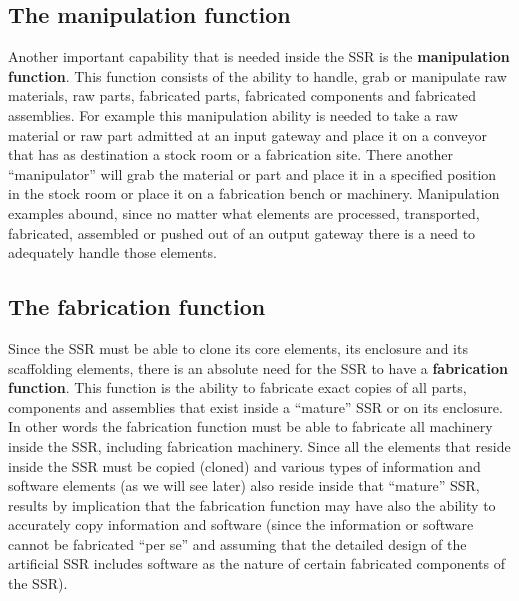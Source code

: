 \bigskip

\subsection[The manipulation function]{The manipulation function}
\hypertarget{RefHeading3072306210128}{}Another important capability that
is needed inside the SSR is the \textbf{manipulation function}. This
function consists of the ability to handle, grab or manipulate raw
materials, raw parts, fabricated parts, fabricated components and
fabricated assemblies. For example this manipulation ability is needed
to take a raw material or raw part admitted at an input gateway and
place it on a conveyor that has as destination a stock room or a
fabrication site. There another “manipulator” will grab the material or
part and place it in a specified position in the stock room or place it
on a fabrication bench or machinery. Manipulation examples abound,
since no matter what elements are processed, transported, fabricated,
assembled or pushed out of an output gateway there is a need to
adequately handle those elements.


\bigskip

\subsection[The fabrication function]{The fabrication function}
\hypertarget{RefHeading3074306210128}{}Since the SSR must be able to
clone its core elements, its enclosure and its scaffolding elements,
there is an absolute need for the SSR to have a \textbf{fabrication
function}. This function is the ability to fabricate exact copies of
all parts, components and assemblies that exist inside a “mature” SSR
or on its enclosure. In other words the fabrication function must be
able to fabricate all machinery inside the SSR, including fabrication
machinery. Since all the elements that reside inside the SSR must be
copied (cloned) and various types of information and software elements
(as we will see later) also reside inside that “mature” SSR, results by
implication that the fabrication function may have also the ability to
accurately copy information and software (since the information or
software cannot be fabricated “per se” and assuming that the detailed
design of the artificial SSR includes software as the nature of certain
fabricated components of the SSR).


\bigskip

